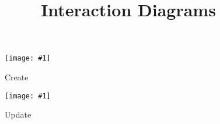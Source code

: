 \documentclass{article}
\newcommand{\diagram}[2]{
	\texttt{[image: \#1]}
	\caption{#2}
}
\newcommand{\vertdiagram}[2]{
	\begin{sidewaysfigure}
		\diagram{#1}{#2}
	\end{sidewaysfigure}
}
\begin{document}
	\title{Interaction Diagrams}
	\date{}
	\maketitle
	\vertdiagram{ControllerInteractionCreate}{Create}
	\vertdiagram{ControllerInteractionUpdate}{Update}
\end{document}

